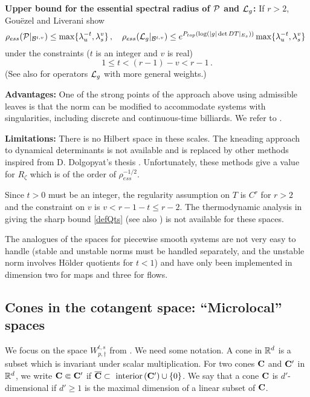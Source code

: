 \documentclass[10pt,twoside]{amsart}
\begin{document}
\medskip

{\bf Upper bound for the essential spectral radius of $\mathcal {P}$ and $\mathcal{L}_g$:}
If $r >2$, Gou\"ezel and Liverani show \cite{GL1,GL2}
$$\rho_{ess}(\mathcal {P}|_{\mathcal{B}^{t,v}})\le \max \{ \lambda_u^{-t}, \lambda_s^{v}\}\, ,
\quad \rho_{ess}(\mathcal{L}_g|_{\mathcal{B}^{t,v}})\le
e^{P_{top}(\log( |g|\det DT|_{E_s}))} \max \{ \lambda_u^{-t}, \lambda_s^{v}\}\
$$
under the constraints ($t$ is an integer and $v$ is real) 
$$
1\le t < (r-1)-v <r-1 \, .
$$ 
(See also \cite{GL2} for operators $\mathcal{L}_g$ with more general weights.)


\smallskip 
{\bf Advantages:}
One of the strong points of the approach above using  admissible leaves is that the
norm can be modified to accommodate systems with singularities, including
discrete and continuous-time billiards.
We refer to \cite{DL, DZ, BDL}. 

\smallskip

{\bf Limitations:} There is no Hilbert space in these scales.
The kneading approach to dynamical determinants is not available and is replaced
by other methods inspired from D. Dolgopyat's thesis
\cite{LTzeta, GLP}. Unfortunately, these methods give a value for $R_\zeta$
which is of the order of $\rho_{ess}^{-1/2}$.

Since $t>0$ must be an integer, the regularity assumption on $T$ is $C^r$ for $r>2$
and  the  constraint on $v$ is $v<r-1-t\le r-2$. The thermodynamic
analysis in \cite[\S3]{BT2} giving the sharp bound \eqref{defQts}  (see also \cite{Ba})
is not available for these spaces.
 
The analogues of the spaces for piecewise smooth systems
\cite{DL, DZ, BDL} are not very easy to handle (stable
and unstable norms must be handled separately, and the 
unstable norm  involves  H\"older quotients for $t<1$) and have only
been implemented in dimension two for maps and three for flows. 



\subsection{Cones in the cotangent space:  ``Microlocal'' spaces   \cite{BT1,BT2,FRS}}
\label{cotang}

We focus on the space $W^{t,s}_{p,\dagger}$ from \cite{BT1}.
We need some notation.
A cone  in $\mathbb{R}^d$ is a subset 
which is invariant under scalar
multiplication.
For two cones $\mathbf{C}$ and $\mathbf{C}'$
in $\mathbb{R}^d$, we write 
$\mathbf{C} \Subset \mathbf{C}'$  
if
$\overline {\mathbf{C}}\subset \mbox{ interior} \, (\mathbf{C}' )\cup \{0\}$.
We say that a cone $\mathbf{C}$ is $d'$-dimensional 
 if $d'\ge 1$
is the maximal dimension of a linear subset of $\mathbf{C}$.
\end{document}

